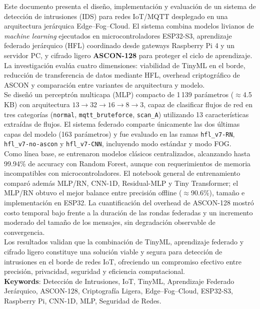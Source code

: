 Este documento presenta el diseño, implementación y evaluación de un sistema de detección de intrusiones (IDS) para redes IoT/MQTT desplegado en una arquitectura jerárquica Edge--Fog--Cloud. El sistema combina modelos livianos de \textit{machine learning} ejecutados en microcontroladores ESP32-S3, aprendizaje federado jerárquico (HFL) coordinado desde gateways Raspberry Pi 4 y un servidor PC, y cifrado ligero \textbf{ASCON-128} para proteger el ciclo de aprendizaje. La investigación evalúa cuatro dimensiones: viabilidad de TinyML en el borde, reducción de transferencia de datos mediante HFL, overhead criptográfico de ASCON y comparación entre variantes de arquitectura y modelo.\\

Se diseñó un perceptrón multicapa (MLP) compacto de 1\,139 parámetros ($\approx$4.5\,KB) con arquitectura $13 \to 32 \to 16 \to 8 \to 3$, capaz de clasificar flujos de red en tres categorías (\texttt{normal}, \texttt{mqtt\_bruteforce}, \texttt{scan\_A}) utilizando 13 características extraídas de flujos. El sistema federado comparte únicamente las dos últimas capas del modelo (163 parámetros) y fue evaluado en las ramas \texttt{hfl\_v7-RN}, \texttt{hfl\_v7-no-ascon} y \texttt{hfl\_v7-CNN}, incluyendo modo estándar y modo FOG.\\

Como línea base, se entrenaron modelos clásicos centralizados, alcanzando hasta 99.94\% de accuracy con Random Forest, aunque con requerimientos de memoria incompatibles con microcontroladores. El notebook general de entrenamiento comparó además MLP/RN, CNN-1D, Residual-MLP y Tiny Transformer; el MLP/RN obtuvo el mejor balance entre precisión offline ($\approx$90.6\%), tamaño e implementación en ESP32. La cuantificación del overhead de ASCON-128 mostró costo temporal bajo frente a la duración de las rondas federadas y un incremento moderado del tamaño de los mensajes, sin degradación observable de convergencia.\\

Los resultados validan que la combinación de TinyML, aprendizaje federado y cifrado ligero constituye una solución viable y segura para detección de intrusiones en el borde de redes IoT, ofreciendo un compromiso efectivo entre precisión, privacidad, seguridad y eficiencia computacional.\\


{\small \textbf{Keywords}: Detección de Intrusiones, IoT, TinyML, Aprendizaje Federado Jerárquico, ASCON-128, Criptografía Ligera, Edge--Fog--Cloud, ESP32-S3, Raspberry Pi, CNN-1D, MLP, Seguridad de Redes.}
